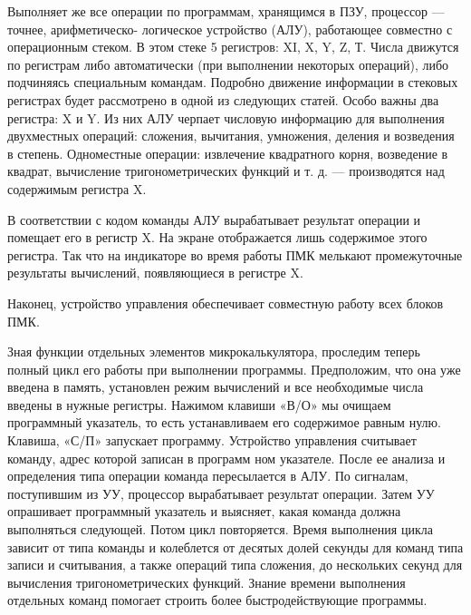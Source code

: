 \documentclass[11pt,a4paper,oneside]{article}
\begin{document}
Выполняет же все операции по программам, хранящимся в ПЗУ, процессор — точнее, арифметическо- логическое устройство (АЛУ), работающее совместно с операционным стеком. В этом стеке 5 регистров: XI, X, Y, Z, Т. Числа движутся по регистрам либо автоматически (при выполнении некоторых операций), либо подчиняясь специальным командам. Подробно движение информации в стековых регистрах будет рассмотрено в одной из следующих статей. Особо важны два регистра: X и Y. Из них АЛУ черпает числовую информацию для выполнения двухместных операций: сложения, вычитания, умножения, деления и возведения в степень. Одноместные операции: извлечение квадратного корня, возведение в квадрат, вычисление тригонометрических функций и т. д. — производятся над содержимым регистра X.

В соответствии с кодом команды АЛУ вырабатывает результат операции и помещает его в регистр X. На экране отображается лишь содержимое этого регистра. Так что на индикаторе во время работы ПМК мелькают промежуточные результаты вычислений, появляющиеся в регистре X.

Наконец, устройство управления обеспечивает совместную работу всех блоков ПМК.

Зная функции отдельных элементов микрокалькулятора, проследим теперь полный цикл его работы при выполнении программы. Предположим, что она уже введена в память, установлен режим вычислений и все необходимые числа введены в нужные регистры. Нажимом клавиши «В/О» мы очищаем программный указатель, то есть устанавливаем его содержимое равным нулю. Клавиша, «С/П» запускает программу. Устройство управления считывает команду, адрес которой записан в программ ном указателе. После ее анализа и определения типа операции команда пересылается в АЛУ. По сигналам, поступившим из УУ, процессор вырабатывает результат операции. Затем УУ опрашивает программный указатель и выясняет, какая команда должна выполняться следующей. Потом цикл повторяется. Время выполнения цикла зависит от типа команды и колеблется от десятых долей секунды для команд типа записи и считывания, а также операций типа сложения, до нескольких секунд для вычисления тригонометрических функций. Знание времени выполнения отдельных команд помогает строить более быстродействующие программы.
\end{document}
